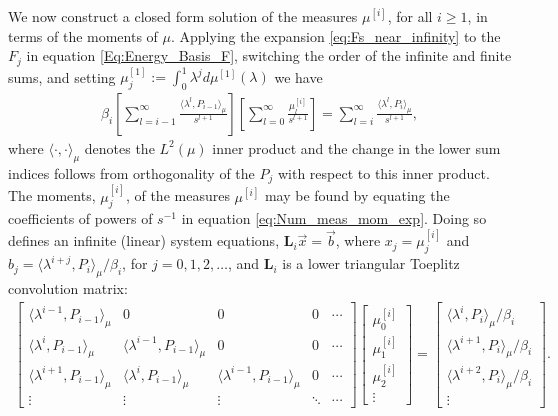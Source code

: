 \documentclass[english,12pt]{ttuthes}
\begin{document}
We now construct a closed form solution of the measures $\mu^{[i]}$,
for all $i\geq1$, in terms of the moments of $\mu$. Applying the expansion
\eqref{eq:Fs_near_infinity} to the $F_j$ in equation
\eqref{Eq:Energy_Basis_F}, switching the order of the infinite and
finite sums, and setting $\mu_j^{[1]}:=\int_0^1\lambda^jd\mu^{[1]}(\lambda)$ we have 
%
\begin{align}\label{eq:Num_meas_mom_exp}
 \beta_i\left[\sum_{l=i-1}^\infty\frac{\langle\lambda^l,P_{i-1}\rangle_\mu}{s^{l+1}}\right]
     \left[\sum_{l=0}^\infty\frac{\mu_l^{[i]}}{s^{l+1}}\right]=\sum_{l=i}^\infty\frac{\langle\lambda^l,P_i\rangle_\mu}{s^{l+1}},
\end{align}
%
where $\langle\cdot,\cdot\rangle_\mu$ denotes the $L^2(\mu)$ inner product and the change in
the lower sum indices follows from orthogonality of the $P_j$ with
respect to this inner product. The moments, $\mu_j^{[i]}$, of the
measures $\mu^{[i]}$ may be found by equating the coefficients of powers
of $s^{-1}$ in equation \eqref{eq:Num_meas_mom_exp}. Doing so defines
an infinite (linear) system equations, $\mathbf{L}_i\vec{x}=\vec{b}$,
where $x_j=\mu_j^{[i]}$ and $b_j=\langle\lambda^{i+j},P_i\rangle_\mu/\beta_i$, for $j=0,1,2,\ldots$,
and $\mathbf{L}_i$ is a lower triangular Toeplitz convolution matrix: 
%
\begin{align}
  \left[
    \begin{matrix}
      \langle\lambda^{i-1},P_{i-1}\rangle_\mu & 0 & 0 & 0&\cdots\\
      \langle\lambda^i,P_{i-1}\rangle_\mu &\langle\lambda^{i-1},P_{i-1}\rangle_\mu & 0 & 0&\cdots\\
      \langle\lambda^{i+1},P_{i-1}\rangle_\mu &\langle\lambda^i,P_{i-1}\rangle_\mu &\langle\lambda^{i-1},P_{i-1}\rangle_\mu & 0&\cdots\\
      \vdots  &  \vdots & \vdots &\ddots &\cdots
    \end{matrix}
  \right]
  \left[
    \begin{matrix}
      \mu_0^{[i]} \\ \mu_1^{[i]} \\ \mu_2^{[i]} \\  \vdots  
    \end{matrix}
  \right]=
  \left[
    \begin{matrix}
       \langle\lambda^i,P_i\rangle_\mu/\beta_i \\  \langle\lambda^{i+1},P_i\rangle_\mu/\beta_i \\  \langle\lambda^{i+2},P_i\rangle_\mu/\beta_i\\  \vdots  
    \end{matrix}
  \right].          
\end{align}
\end{document}
